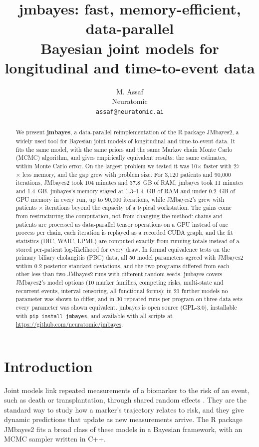 \documentclass[11pt]{article}
\title{\textbf{jmbayes}: fast, memory-efficient, data-parallel\\
Bayesian joint models for longitudinal and time-to-event data}
\author{M. Assaf\\ Neuratomic\\ \texttt{assaf@neuratomic.ai}}
\date{}
\begin{document}
\maketitle

\begin{abstract}
We present \textbf{jmbayes}, a data-parallel reimplementation of the R package JMbayes2,
a widely used tool for Bayesian joint models of longitudinal and time-to-event data. It
fits the same model, with the same priors and the same Markov chain Monte Carlo (MCMC)
algorithm, and gives empirically equivalent results: the same estimates, within
Monte Carlo error. On the largest problem we tested it was
10$\times$ faster with 27$\times$ less memory, and the gap grew with problem size. For 3,120 patients and 90,000 iterations, JMbayes2 took
104 minutes and 37.8~GB of RAM; jmbayes took 11 minutes and 1.4~GB. jmbayes's memory stayed at
1.3--1.4~GB of RAM and under 0.2~GB of GPU memory in every run, up to 90,000 iterations,
while JMbayes2's grew with patients $\times$ iterations beyond the capacity of a typical
workstation. The gains come from restructuring the computation, not from changing the
method: chains and patients are processed as data-parallel tensor operations on a GPU
instead of one process per chain, each iteration is replayed as a recorded CUDA graph, and
the fit statistics (DIC, WAIC, LPML) are computed exactly from running totals instead of a
stored per-patient log-likelihood for every draw. In formal equivalence tests on the
primary biliary cholangitis (PBC) data, all 50 model parameters agreed with JMbayes2 within
0.2 posterior standard deviations, and the two programs differed from each other less than
two JMbayes2 runs with different random seeds. jmbayes covers JMbayes2's model options
(10 marker families, competing risks, multi-state and recurrent events, interval
censoring, all functional forms); in 21 further models no parameter was shown to
differ, and in 30 repeated runs per program on three data sets every parameter was shown
equivalent. jmbayes is open source (GPL-3.0),
installable with \texttt{pip install jmbayes}, and available with all scripts at
\url{https://github.com/neuratomic/jmbayes}.
\end{abstract}

\section{Introduction}

Joint models link repeated measurements of a biomarker to the risk of an event, such as
death or transplantation, through shared random effects
\cite{tsiatis2004,rizopoulos2012}. They are the standard way to study how a marker's
trajectory relates to risk, and they give dynamic predictions that update as new
measurements arrive. The R package JMbayes2 \cite{jmbayes2} fits a broad class of these
models in a Bayesian framework, with an MCMC sampler written in C++.
\end{document}
